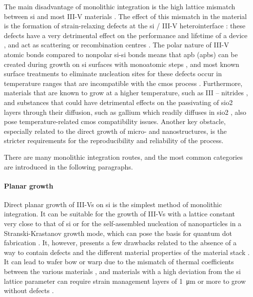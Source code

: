 The main disadvantage of monolithic integration is the high lattice mismatch between \acl{si} and most III-V materials \cite{Kuech2016}. The effect of this mismatch in the material is the formation of strain-relaxing defects at the \acl{si} / III-V heterointerface \cite{Kunert2018, Shi2021}: these defects have a very detrimental effect on the performance and lifetime of a device \cite{Mahajan2000, Zenari2021}, and act as scattering or recombination centres \cite{Jeon2015}. The polar nature of III-V atomic bonds compared to nonpolar \acs{si}-\acs{si} bonds means that \acl{apb} (\acs{apb}s) can be created during growth on \acl{si} surfaces with monoatomic steps \cite{Kunert2018}, and most known surface treatments to eliminate nucleation sites for these defects occur in temperature ranges that are incompatible with the \acs{cmos} process \cite{Laracuente2003, Kunert2018, Miller2000}. Furthermore, materials that are known to grow at a higher temperature, such as III – nitrides \cite{Huang2017}, and substances that could have detrimental effects on the passivating of \acf{sio2} layers through their diffusion, such as gallium \cite{Miller2000} which readily diffuses in \acl{sio2} \cite{VanOmmen1987}, also pose temperature-related \acs{cmos} compatibility issues. Another key obstacle, especially related to the direct growth of micro- and nanostructures, is the stricter requirements for the reproducibility and reliability of the process.

There are many monolithic integration routes, and the most common categories are introduced in the following paragraphs.

\paragraph{Planar growth} Direct planar growth of III-Vs on \acl{si} is the simplest method of monolithic integration. It can be suitable for the growth of III-Vs with a lattice constant very close to that of \acl{si} or for the self-assembled nucleation of nanoparticles in a Stranski-Krastanov growth mode, which can pose the basis for quantum dot fabrication \cite{Shi2016, Reithmaier2016}. It, however, presents a few drawbacks related to the absence of a way to contain defects and the different material properties of the material stack \cite{Ravash2012}. It can lead to wafer bow or warp due to the mismatch of thermal coefficients between the various materials \cite{Miyoshi2016, Wang2017_2}, and materials with a high deviation from the \acl{si} lattice parameter can require strain management layers of \qty{1}{\micro\metre} or more to grow without defects \cite{Wang2017_2, Cantoro2012, Huang2022}.
\par
